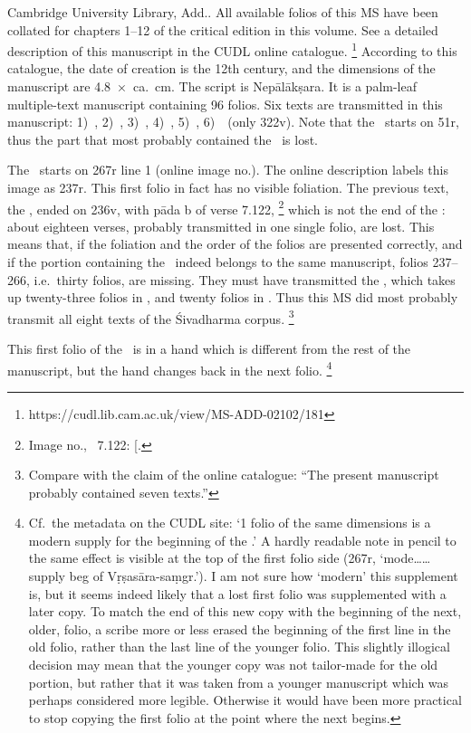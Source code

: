 Cambridge University Library, Add.. 
All available folios of this MS have been collated for 
chapters 1--12 of the critical edition in this volume. 
See a detailed description of this manuscript 
in the CUDL online catalogue.%
	\footnote{https://cudl.lib.cam.ac.uk/view/MS-ADD-02102/181}
According to this catalogue, the date of creation is the 12th
century, and the dimensions of the manuscript are 
4.8~×~ca.~cm. 
The script is Nepālākṣara. It is a palm-leaf multiple-text manuscript
containing 96 folios. Six texts are transmitted in this manuscript: 
1)~\SDhU,
2)~\SDhSangr,
3)~\Ums,
4)~\SivaUp,
5)~\Vss,
6)~\DharmP\ (only \fol322v). 
Note that the \SDhU\ starts on \fol51r, thus the part that most probably contained the \SDhS\ is lost.

The \VSS\ starts on \fol267r line 1 
(online image no.). 
The online description labels this image as \fol237r. 
This first folio in fact has no visible foliation.
The previous text, the \SivaUp,
ended on \fol236v, with pāda b of verse 7.122,%
 		\footnote{Image no., 
                  \SivaUp\ 7.122: 
                  {[}\skt{prāsā}{]}.}
which is not the end of the \SivaUp: 
about eighteen verses, probably transmitted in one single folio, are lost.
This means that, if the foliation and the order of the folios
are presented correctly, and if the portion containing
the \VSS\ indeed belongs to the same manuscript, 
folios 237--266, i.e.\ thirty folios, are missing. 
They must have transmitted the \Uums, 
which takes up twenty-three folios in \msCa, and twenty folios in \msCb.
Thus this MS did most probably transmit all eight texts of the
Śivadharma corpus.%
	\footnote{Compare with the claim of the online catalogue:
		``The present manuscript probably contained seven texts.''}	

This first folio of the \VSS\ is in a hand which is different from the
rest of the manuscript, but the hand changes back in the next folio.%
	\footnote{Cf.~the metadata on the CUDL site: 
	`1 folio of the same dimensions is a modern supply for the 
	beginning of the .' A hardly readable 
	note in pencil to the same effect is visible at the
    top of the first folio side (\fol267r, `mode\ldots{}\ldots{} supply beg
    of Vṛṣasāra-saṃgr.'). I am not sure how `modern' this supplement is,
   but it seems indeed likely that a lost first folio was supplemented
   with a later copy. To match the end of this new copy with the
   beginning of the next, older, folio, a scribe more or less erased the
   beginning of the first line in the old folio, rather than the last line
   of the younger folio. This slightly illogical decision may mean that the younger
   copy was not tailor-made for the old portion, but rather that it was
   taken from a younger manuscript which was perhaps considered more
   legible. Otherwise it would have been more practical to stop copying
   the first folio at the point where the next begins.}

